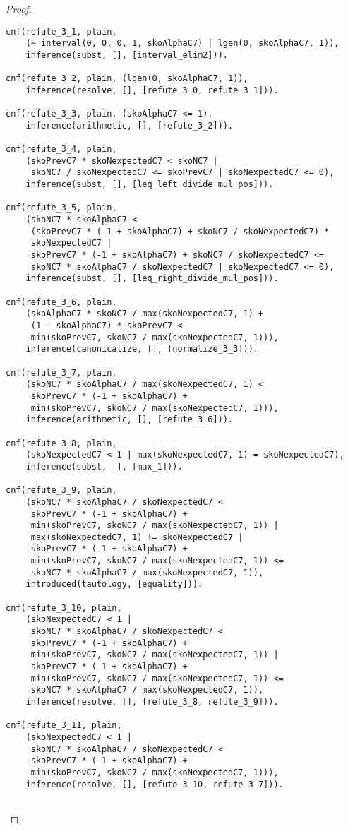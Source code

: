 \begin{proof}
\begin{verbatim}
cnf(refute_3_1, plain,
    (~ interval(0, 0, 0, 1, skoAlphaC7) | lgen(0, skoAlphaC7, 1)),
    inference(subst, [], [interval_elim2])).

cnf(refute_3_2, plain, (lgen(0, skoAlphaC7, 1)),
    inference(resolve, [], [refute_3_0, refute_3_1])).

cnf(refute_3_3, plain, (skoAlphaC7 <= 1),
    inference(arithmetic, [], [refute_3_2])).

cnf(refute_3_4, plain,
    (skoPrevC7 * skoNexpectedC7 < skoNC7 |
     skoNC7 / skoNexpectedC7 <= skoPrevC7 | skoNexpectedC7 <= 0),
    inference(subst, [], [leq_left_divide_mul_pos])).

cnf(refute_3_5, plain,
    (skoNC7 * skoAlphaC7 <
     (skoPrevC7 * (-1 + skoAlphaC7) + skoNC7 / skoNexpectedC7) *
     skoNexpectedC7 |
     skoPrevC7 * (-1 + skoAlphaC7) + skoNC7 / skoNexpectedC7 <=
     skoNC7 * skoAlphaC7 / skoNexpectedC7 | skoNexpectedC7 <= 0),
    inference(subst, [], [leq_right_divide_mul_pos])).

cnf(refute_3_6, plain,
    (skoAlphaC7 * skoNC7 / max(skoNexpectedC7, 1) +
     (1 - skoAlphaC7) * skoPrevC7 <
     min(skoPrevC7, skoNC7 / max(skoNexpectedC7, 1))),
    inference(canonicalize, [], [normalize_3_3])).

cnf(refute_3_7, plain,
    (skoNC7 * skoAlphaC7 / max(skoNexpectedC7, 1) <
     skoPrevC7 * (-1 + skoAlphaC7) +
     min(skoPrevC7, skoNC7 / max(skoNexpectedC7, 1))),
    inference(arithmetic, [], [refute_3_6])).

cnf(refute_3_8, plain,
    (skoNexpectedC7 < 1 | max(skoNexpectedC7, 1) = skoNexpectedC7),
    inference(subst, [], [max_1])).

cnf(refute_3_9, plain,
    (skoNC7 * skoAlphaC7 / skoNexpectedC7 <
     skoPrevC7 * (-1 + skoAlphaC7) +
     min(skoPrevC7, skoNC7 / max(skoNexpectedC7, 1)) |
     max(skoNexpectedC7, 1) != skoNexpectedC7 |
     skoPrevC7 * (-1 + skoAlphaC7) +
     min(skoPrevC7, skoNC7 / max(skoNexpectedC7, 1)) <=
     skoNC7 * skoAlphaC7 / max(skoNexpectedC7, 1)),
    introduced(tautology, [equality])).

cnf(refute_3_10, plain,
    (skoNexpectedC7 < 1 |
     skoNC7 * skoAlphaC7 / skoNexpectedC7 <
     skoPrevC7 * (-1 + skoAlphaC7) +
     min(skoPrevC7, skoNC7 / max(skoNexpectedC7, 1)) |
     skoPrevC7 * (-1 + skoAlphaC7) +
     min(skoPrevC7, skoNC7 / max(skoNexpectedC7, 1)) <=
     skoNC7 * skoAlphaC7 / max(skoNexpectedC7, 1)),
    inference(resolve, [], [refute_3_8, refute_3_9])).

cnf(refute_3_11, plain,
    (skoNexpectedC7 < 1 |
     skoNC7 * skoAlphaC7 / skoNexpectedC7 <
     skoPrevC7 * (-1 + skoAlphaC7) +
     min(skoPrevC7, skoNC7 / max(skoNexpectedC7, 1))),
    inference(resolve, [], [refute_3_10, refute_3_7])).


\end{verbatim}
\end{proof}
